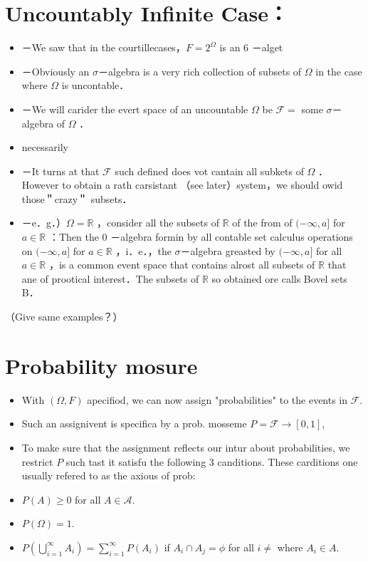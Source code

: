 \documentclass[10pt]{article}
\begin{document}
\section*{Uncountably Infinite Case：}
\begin{itemize}
  \item[] －We saw that in the courtillecases，\(F=2^{\Omega}\) is an 6 －alget
  \item[] －Obviously an \(\sigma\)－algebra is a very rich collection of subsets of \(\Omega\) in the case where \(\Omega\) is uncontable．
  \item[] －We will carider the evert space of an uncountable \(\Omega\) be \(\mathcal{F}=\) some \(\sigma\)－algebra of \(\Omega\) ．
  \item[] necessarily
  \item[] －It turns at that \(\mathcal{F}\) such defined does vot cantain all subkets of \(\Omega\) ．However to obtain a rath carsistant （see later）system，we should owid those＂crazy＂ subsets．
  \item[] －e．g．）\(\Omega=\mathbb{R}\) ，consider all the subsets of \(\mathbb{R}\) of the from of \((-\infty, a]\) for \(a \in \mathbb{R}\) ：Then the 0 －algebra formin by all contable set calculus operations on \((-\infty, a]\) for \(a \in \mathbb{R}\) ，i．e．，the \(\sigma\)－algebra greasted by \((-\infty, a]\) for all \(a \in \mathbb{R}\) ，is a common event space that contains alrost all subsets of \(\mathbb{R}\) that ane of prootical interest．The subsets of \(\mathbb{R}\) so obtained ore calls Bovel sets B．
\end{itemize}

（Give same examples？）

\section*{Probability mosure}
\begin{itemize}
  \item[-] With \((\Omega, F)\) apecifiod, we can now assign "probabilities" to the events in \(\mathcal{F}\).
  \item[-] Such an assignivent is specifica by a prob. mosseme \(P=\mathcal{F} \rightarrow[0,1]\),
  \item[-] To make sure that the assignment reflects our intur about probabilities, we restrict \(P\) such tast it satisfu the following 3 canditions. These carditions one usually refered to as the axious of prob:
  \item[(1)] \(P(A) \geqslant 0\) for all \(A \in \mathcal{A}\).
  \item[(2)] \(P(\Omega)=1\).
  \item[(3)] \(P\left(\bigcup_{i=1}^{\infty} A_{i}\right)=\sum_{i=1}^{\infty} P\left(A_{i}\right)\) if \(A_{i} \cap A_{j}=\phi\) for all \(i \neq\) where \(A_{i} \in A\).
\end{itemize}
\end{document}
